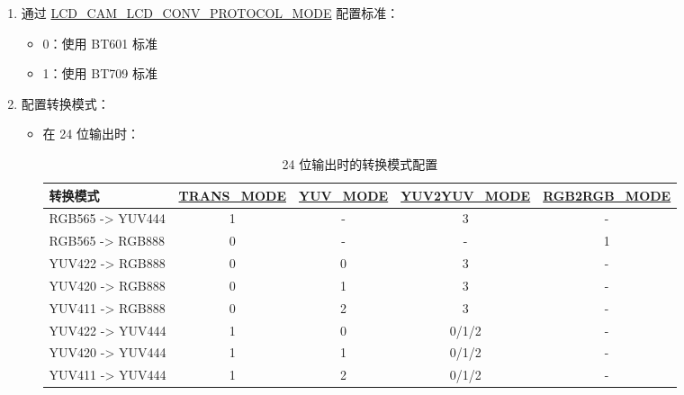 \documentclass[main\_\_CN.tex]{subfiles}
\begin{document}
\begin{enumerate}
\begin{itemize}
\begin{itemize}
        \end{itemize}
    \end{itemize}
    \item 通过 \hyperref[fielddesc:LCDCAMLCDCONVPROTOCOLMODE]{LCD\_CAM\_LCD\_CONV\_PROTOCOL\_MODE} 配置标准：
    \begin{itemize}
        \item 0：使用 BT601 标准
        \item 1：使用 BT709 标准
    \end{itemize}
    \item 配置转换模式：
    \begin{itemize}
        \item 在 24 位输出时：
                      \begin{table}[H]
                \caption{24 位输出时的转换模式配置}
                \centering
                \begin{threeparttable}
                \begin{tabular}{|l|c|c|c|c|}
                \hline
                \rowcolor{lightgray}
                \textbf{转换模式} & \textbf{\hyperref[fielddesc:LCDCAMLCDCONVTRANSMODE]{TRANS\_MODE}}\tnote{1} & \textbf{\hyperref[fielddesc:LCDCAMLCDCONVYUVMODE]{YUV\_MODE}}\tnote{2} & \textbf{\hyperref[fielddesc:LCDCAMLCDCONVYUV2YUVMODE]{YUV2YUV\_MODE}}\tnote{3} & 
                \textbf{\hyperref[fielddesc:LCDCAMLCDCONVRGB2RGBMODE]{RGB2RGB\_MODE}}\tnote{4} \\ \hline
                RGB565 -> YUV444 & 1 & - & 3 & - \\ \hline
                RGB565 -> RGB888 & 0 & - & - & 1 \\ \hline
                YUV422 -> RGB888 & 0 & 0 & 3 & - \\ \hline
                YUV420 -> RGB888 & 0 & 1 & 3 & - \\ \hline                
                YUV411 -> RGB888 & 0 & 2 & 3 & - \\ \hline
                YUV422 -> YUV444 & 1 & 0 & 0/1/2 & - \\ \hline
                YUV420 -> YUV444 & 1 & 1 & 0/1/2 & - \\ \hline
                YUV411 -> YUV444 & 1 & 2 & 0/1/2 & - \\ \hline
                \end{tabular}
            
\end{threeparttable}
\end{table}
\end{itemize}
\end{enumerate}
\end{document}
